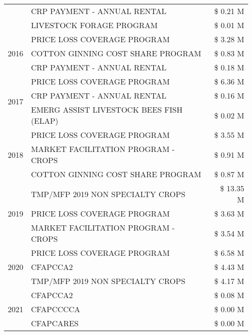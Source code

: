 \begin{tabular}{llr}
 & CRP PAYMENT - ANNUAL RENTAL & \$ 0.21 M \\
 & LIVESTOCK FORAGE PROGRAM & \$ 0.01 M \\
\cline{1-3}
\multirow[t]{3}{*}{2016} & PRICE LOSS COVERAGE PROGRAM & \$ 3.28 M \\
 & COTTON GINNING COST SHARE PROGRAM & \$ 0.83 M \\
 & CRP PAYMENT - ANNUAL RENTAL & \$ 0.18 M \\
\cline{1-3}
\multirow[t]{3}{*}{2017} & PRICE LOSS COVERAGE PROGRAM & \$ 6.36 M \\
 & CRP PAYMENT - ANNUAL RENTAL & \$ 0.16 M \\
 & EMERG ASSIST LIVESTOCK BEES FISH (ELAP) & \$ 0.02 M \\
\cline{1-3}
\multirow[t]{3}{*}{2018} & PRICE LOSS COVERAGE PROGRAM & \$ 3.55 M \\
 & MARKET FACILITATION PROGRAM - CROPS & \$ 0.91 M \\
 & COTTON GINNING COST SHARE PROGRAM & \$ 0.87 M \\
\cline{1-3}
\multirow[t]{3}{*}{2019} & TMP/MFP 2019 NON SPECIALTY CROPS & \$ 13.35 M \\
 & PRICE LOSS COVERAGE PROGRAM & \$ 3.63 M \\
 & MARKET FACILITATION PROGRAM - CROPS & \$ 3.54 M \\
\cline{1-3}
\multirow[t]{3}{*}{2020} & PRICE LOSS COVERAGE PROGRAM & \$ 6.58 M \\
 & CFAPCCA2 & \$ 4.43 M \\
 & TMP/MFP 2019 NON SPECIALTY CROPS & \$ 4.17 M \\
\cline{1-3}
\multirow[t]{3}{*}{2021} & CFAPCCA2 & \$ 0.08 M \\
 & CFAPCCCCA & \$ 0.00 M \\
 & CFAPCARES & \$ 0.00 M \\
\cline{1-3}
\bottomrule
\end{tabular}
